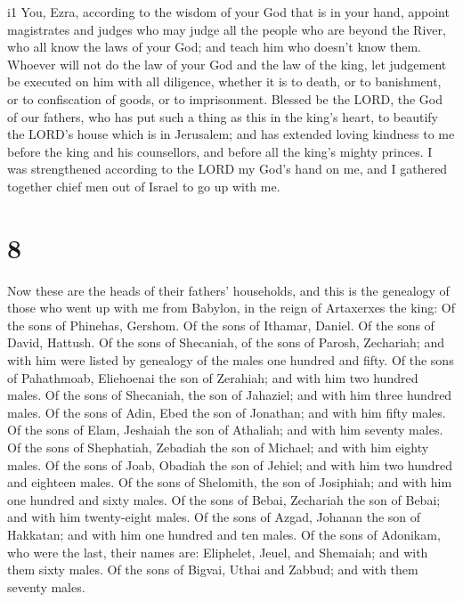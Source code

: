 i1 You, Ezra, according to the wisdom of your God that is
in your hand, appoint magistrates and judges who may judge all the
people who are beyond the River, who all know the laws of your God; and
teach him who doesn't know them.  Whoever will not do the
law of your God and the law of the king, let judgement be executed on
him with all diligence, whether it is to death, or to banishment, or to
confiscation of goods, or to imprisonment.  Blessed be
the LORD, the God of our fathers, who has put such a thing as this in
the king's heart, to beautify the LORD's house which is in Jerusalem;
 and has extended loving kindness to me before the king
and his counsellors, and before all the king's mighty princes. I was
strengthened according to the LORD my God's hand on me, and I gathered
together chief men out of Israel to go up with me.

\hypertarget{section-7}{%
\section{8}\label{section-7}}

 Now these are the heads of their fathers' households, and
this is the genealogy of those who went up with me from Babylon, in the
reign of Artaxerxes the king:  Of the sons of Phinehas,
Gershom. Of the sons of Ithamar, Daniel. Of the sons of David, Hattush.
 Of the sons of Shecaniah, of the sons of Parosh,
Zechariah; and with him were listed by genealogy of the males one
hundred and fifty.  Of the sons of Pahathmoab, Eliehoenai
the son of Zerahiah; and with him two hundred males.  Of
the sons of Shecaniah, the son of Jahaziel; and with him three hundred
males.  Of the sons of Adin, Ebed the son of Jonathan; and
with him fifty males.  Of the sons of Elam, Jeshaiah the
son of Athaliah; and with him seventy males.  Of the sons
of Shephatiah, Zebadiah the son of Michael; and with him eighty males.
 Of the sons of Joab, Obadiah the son of Jehiel; and with
him two hundred and eighteen males.  Of the sons of
Shelomith, the son of Josiphiah; and with him one hundred and sixty
males.  Of the sons of Bebai, Zechariah the son of Bebai;
and with him twenty-eight males.  Of the sons of Azgad,
Johanan the son of Hakkatan; and with him one hundred and ten males.
 Of the sons of Adonikam, who were the last, their names
are: Eliphelet, Jeuel, and Shemaiah; and with them sixty males.
 Of the sons of Bigvai, Uthai and Zabbud; and with them
seventy males.

